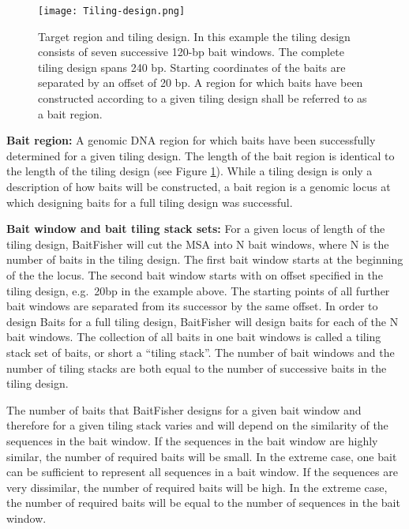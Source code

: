 \documentclass[a4paper,pdflatex,11pt]{article}
\begin{document}

\begin{figure}
  \centering
      \texttt{[image: Tiling-design.png]}
  
  \caption{Target region and tiling design. In this example the tiling design
consists of seven successive 120-bp bait windows. The complete tiling design
spans 240 bp. Starting coordinates of the baits are separated by an
offset of 20 bp. A region for which baits have been constructed
according to a given tiling design shall be referred to as a bait
region.\label{label_Fig_TilingDesing}}
\end{figure}


\textbf{Bait region:}
A genomic DNA region for which baits have been successfully determined
for a given tiling design. The length of the bait region is identical to
the length of the tiling design (see Figure \ref{label_Fig_TilingDesing}).
While a tiling design is only a description of how baits will be constructed, a bait region
is a genomic locus at which designing baits for a full tiling design was successful.



\textbf{Bait window and bait tiling stack sets:}
For a given locus of length of the tiling design, BaitFisher will cut the MSA into
N bait windows, where N is the number of baits in the tiling design.
The first bait window starts at the beginning of the the locus.
The second bait window starts with on offset specified in the tiling design, e.g.\ 20bp
in the example above.
The starting points of all further bait windows are separated from its successor 
by the same offset.
In order to design Baits for a full tiling design, 
BaitFisher will design baits for each of the N bait windows.
The collection of all baits in one bait windows is called a tiling stack set of baits,
or short a ``tiling stack''.
The number of bait windows and the number of tiling stacks are both equal to the number of
successive baits in the tiling design.

The number of baits that BaitFisher designs for a given bait window and therefore
for a given tiling stack
varies and will depend on the similarity of the sequences in the bait window.
If the sequences in the bait window are highly similar, the number of required baits will be small.
In the extreme case, one bait can be sufficient to represent all sequences in a bait window.
If the sequences are very dissimilar, the number of required baits will be high.
In the extreme case, the number of required baits will be equal to the number of sequences
in the bait window.
\end{document}
